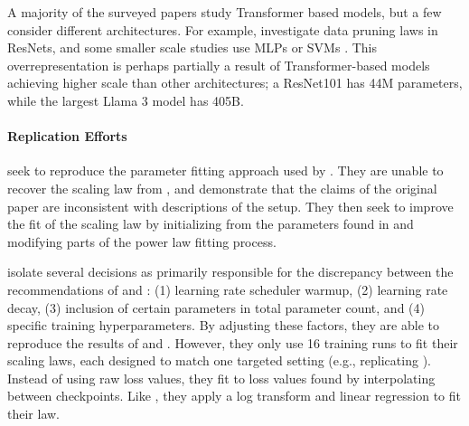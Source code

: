 A majority of the surveyed papers study Transformer \citep{vaswani2017attention} based models, but a few consider different architectures. For example, \cite{sorscher2022beyond} investigate data pruning laws in ResNets, and some smaller scale studies use MLPs or SVMs \citep{hashimoto2021model}. This overrepresentation is perhaps partially a result of Transformer-based models achieving higher scale than other architectures; a ResNet101 has 44M parameters, while the largest Llama 3 model has 405B.

\paragraph{Replication Efforts} \citet{besiroglu2024chinchilla} seek to reproduce the parameter fitting approach used by \citet{hoffmann2022training}. They are unable to recover the scaling law from \citet{hoffmann2022training}, and demonstrate that the claims of the original paper are inconsistent with descriptions of the setup. They then seek to improve the fit of the scaling law by initializing from the parameters found in \citet{hoffmann2022training} and modifying parts of the power law fitting process.


\citet{porian2024resolving} isolate several decisions as primarily responsible for the discrepancy between the recommendations of \citet{kaplan2020scaling} and \citet{hoffmann2022training}: (1) learning rate scheduler warmup, (2) learning rate decay, (3) inclusion of certain parameters in total parameter count, and (4) specific training hyperparameters. By adjusting these factors, they are able to reproduce the results of \citet{kaplan2020scaling} and \citet{hoffmann2022training}. However, they only use 16 training runs to fit their scaling laws, each designed to match one targeted setting (e.g., replicating \citet{kaplan2020scaling}). 
Instead of using raw loss values, they fit to loss values found by interpolating between checkpoints. Like \citet{pearce2024reconcilingkaplanchinchillascaling}, they apply a log transform and linear regression to fit their law.



